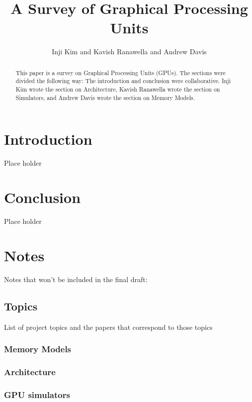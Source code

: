 \documentclass[conference]{IEEEtran}
\title{A Survey of Graphical Processing Units}
\author{\normalsize{Inji Kim and Kavish Ranawella and Andrew Davis}}
\begin{document}
\maketitle
\thispagestyle{plain}
\pagestyle{plain}




\begin{abstract}
  This paper is a survey on Graphical Processing Units (GPUs).
  The sections were divided the following way: The introduction and conclusion were collaborative.
  Inji Kim wrote the section on Architecture, Kavish Ranawella wrote the section on Simulators, and Andrew Davis wrote the section on Memory Models.
\end{abstract}

\section{Introduction}
Place holder



\section{Conclusion}
Place holder


\clearpage
\appendix
\section{Notes}
Notes that won't be included in the final draft:
\subsection{Topics}
List of project topics and the papers that correspond to those topics
\subsubsection{Memory Models}
\cite{Bakhoda2009}
\cite{Ibrahim2020}
\cite{Singh2013}
\cite{Pratheek2023}
\cite{Mei2015}
\cite{Liu2018}
\cite{Fung2011ISM}
\cite{Jog2013OWL}
\cite{Kadam2018}
\cite{Liu2020}
\cite{Jog2013}
\subsubsection{Architecture}
\cite{Bakhoda2009}
\cite{Yan2022}
\cite{Hayes2019}
\cite{Sanudo2020}
\cite{Laguna2022}
\cite{Zhu2019}
\cite{Fung2011HPC}
\subsubsection{GPU simulators}
\cite{Khairy2020}
\cite{Kandiah2021}
\cite{Bakhoda2009}
\cite{Hayes2019}
\cite{Raihan2018}
\cite{Liu2020}
\cite{Jog2013}




\end{document}
